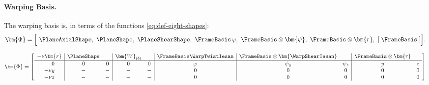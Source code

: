 \paragraph{Warping Basis.}
The warping basis is, in terms of the functions \eqref{eq:def-eight-shapes}:
\[
\bm{\Phi}=\Big[
\ \PlaneAxialShape,
\ \PlaneShape,
\ \PlaneShearShape,
\ \FrameBasis\,\varphi,
\ \FrameBasis\otimes\bm{\psi},
\ \FrameBasis\otimes\bm{r},
\ [\;\FrameBasis\;]
\Big].
\]

$$
\begin{aligned}
\bm{\Phi} = 
\left[\begin{array}{c|cc|cc|c|cc|cc} %
-\nu \bm{r} & \PlaneShape & &\bm{W}_{(b)} & & \FrameBasis\WarpTwistIesan & \FrameBasis\otimes\bm{\WarpShearIesan} && \FrameBasis\otimes\bm{r} & \\ \hline 
~~~~ 0 & 0 & 0 & 0 & 0 &  \varphi & \psi_{y} & \psi_{z} &  y & z \\ %
-\nu y & - & - & - & - &  0 & 0 & 0                     &  0 & 0 \\ %
-\nu z & - & - & - & - &  0 & 0 & 0                     &  0 & 0 \\ %
\end{array}\right]
\end{aligned}
$$
